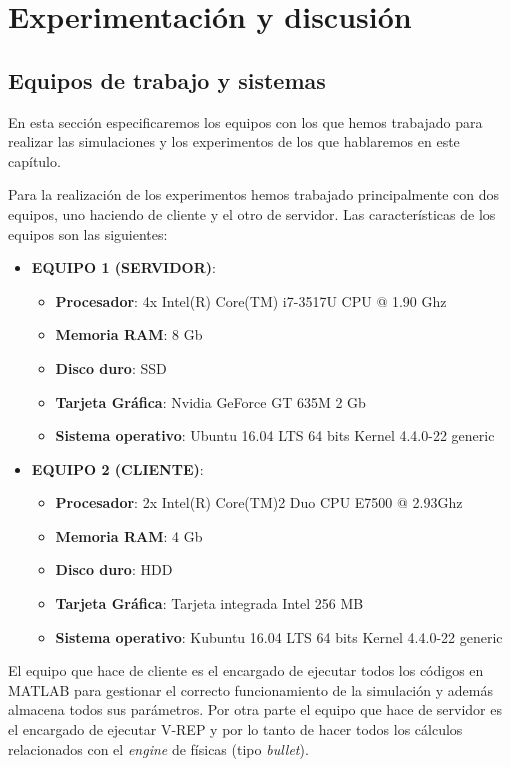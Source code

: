 \pagestyle{scrheadings}
\ihead[]{\rightmark}
\ofoot[]{\thepage{}}
\chapter{Experimentación y discusión}\label{ch:capitulo5}
\section{Equipos de trabajo y sistemas}
En esta sección especificaremos los equipos con los que hemos trabajado para realizar las simulaciones y los experimentos de los que hablaremos en este capítulo.

Para la realización de los experimentos hemos trabajado principalmente con dos equipos, uno haciendo de cliente y el otro de servidor.
Las características de los equipos son las siguientes:
\begin{itemize}
\item \textbf{EQUIPO 1 (SERVIDOR)}:
\begin{itemize}
\item \textbf{Procesador}: 4x Intel(R) Core(TM) i7-3517U CPU @ 1.90 Ghz
\item \textbf{Memoria RAM}: 8 Gb
\item \textbf{Disco duro}: SSD
\item \textbf{Tarjeta Gráfica}: Nvidia GeForce GT 635M 2 Gb
\item \textbf{Sistema operativo}: Ubuntu 16.04 LTS 64 bits Kernel 4.4.0-22 generic
\end{itemize}
\item \textbf{EQUIPO 2 (CLIENTE)}:
\begin{itemize}
\item \textbf{Procesador}: 2x Intel(R) Core(TM)2 Duo CPU E7500 @ 2.93Ghz
\item \textbf{Memoria RAM}: 4 Gb
\item \textbf{Disco duro}: HDD
\item \textbf{Tarjeta Gráfica}: Tarjeta integrada Intel 256 MB
\item \textbf{Sistema operativo}: Kubuntu 16.04 LTS 64 bits Kernel 4.4.0-22 generic
\end{itemize}
\end{itemize}
El equipo que hace de cliente es el encargado de ejecutar todos los códigos en MATLAB para gestionar el correcto funcionamiento de la simulación y además almacena todos sus parámetros.
Por otra parte el equipo que hace de servidor es el encargado de ejecutar V-REP y por lo tanto de hacer todos los cálculos relacionados con el \textit{engine} de físicas (tipo \textit{bullet}).
